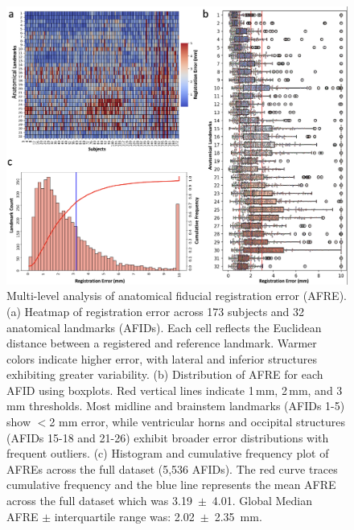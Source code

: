 \begin{figure}[hbt!]
    \centering
    \includegraphics[width=1\linewidth]{figs/ch2_Figure_AFREs.png}
    \caption{Multi-level analysis of anatomical fiducial registration error (AFRE). (a) Heatmap of registration error across 173 subjects and 32 anatomical landmarks (AFIDs). Each cell reflects the Euclidean distance between a registered and reference landmark. Warmer colors indicate higher error, with lateral and inferior structures exhibiting greater variability. (b) Distribution of AFRE for each AFID using boxplots. Red vertical lines indicate 1\,mm, 2\,mm, and 3\,mm thresholds. Most midline and brainstem landmarks (AFIDs 1-5) show \(<\)2 mm error, while ventricular horns and occipital structures (AFIDs 15-18 and 21-26) exhibit broader error distributions with frequent outliers. (c) Histogram and cumulative frequency plot of AFREs across the full dataset (5,536 AFIDs). The red curve traces cumulative frequency and the blue line represents the mean AFRE across the full dataset which was 3.19~\(\pm\)~4.01. Global Median AFRE \(\pm\) interquartile range was: 2.02~\(\pm\)~2.35~mm.
    }
    \label{fig:ch2_Figure_afres}
\end{figure}

